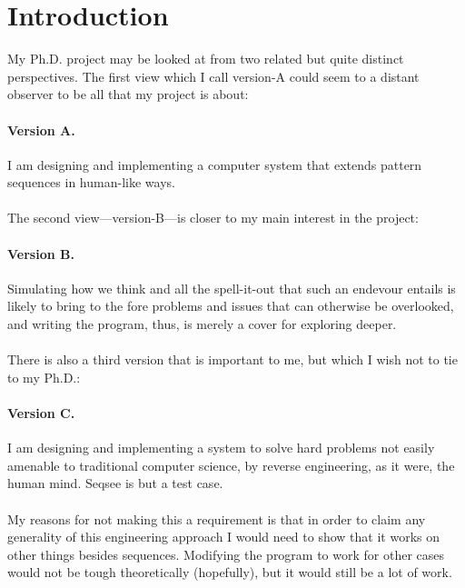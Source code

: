 \documentclass{article}
\begin{document}
\section{Introduction}
\label{sec:intro}

\newcommand{\V}[1]{version-#1\xspace}
\newcommand{\hof}{Hofstadter\xspace}
\newcommand{\dan}{Dan Dennett\xspace}
\newcommand{\andy}{Andy Clark\xspace}
\newcommand{\seq}{Seqsee\xspace}
\newcommand{\tofillout}[1]{[Need to fill gap: #1\index{Gaps!#1}]}


My Ph.D. project may be looked at from two related but quite distinct perspectives.  The first view which I call \V{A} could seem to a distant observer to be all that my project is about:

\paragraph{Version A.} I am designing and implementing a computer system that extends pattern sequences in human-like ways.

\paragraph{} The second view---\V{B}---is closer to my main interest in the project:

\paragraph{Version B.} Simulating how we think and all the spell-it-out that such an endevour entails is likely to bring to the fore problems and issues that can otherwise be overlooked, and writing the program, thus, is merely a cover for  exploring deeper.

\paragraph{} There is also a third version that is important to me, but which I wish not to tie to my Ph.D.:

\paragraph{Version C.}  I am designing and implementing a system to solve hard problems not easily amenable to traditional computer science, by reverse engineering, as it were, the human mind.  Seqsee is but a test case.

\paragraph{} My reasons for not making this a requirement is that in order to claim any generality of this engineering approach I would need to show that it works on other things besides sequences.  Modifying the program to work for other cases would not be tough theoretically (hopefully), but it would still be a lot of work.
\end{document}
